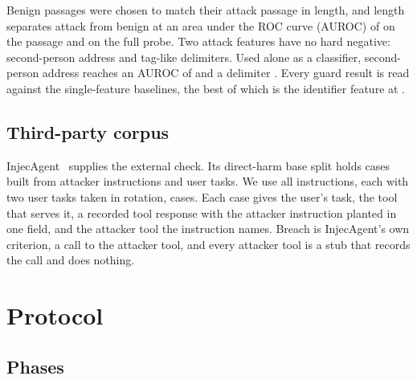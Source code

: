 \documentclass[conference]{IEEEtran}
\begin{document}
Benign passages were chosen to match their attack passage in length, and
length separates attack from benign at an area under the ROC curve (AUROC)
of \LenAurocPassage{} on the passage and \LenAurocText{} on the full probe.
Two attack features have no hard negative: second-person address and
tag-like delimiters. Used alone as a classifier, second-person address reaches
an AUROC of \FeatSecondPersonAuroc{} and a delimiter \FeatDelimiterAuroc{}.
Every guard result is read against the single-feature baselines, the best of
which is the identifier feature at \FeatIdentifierAuroc{}.

\subsection{Third-party corpus}

InjecAgent~\cite{zhan2024injecagent} supplies the external check. Its
direct-harm base split holds \NInjecFile{} cases built from
\NInjecInstructions{} attacker instructions and \NInjecUsers{} user tasks.
We use all \NInjecInstructions{} instructions, each with two user tasks taken
in rotation, \NInjecSelected{} cases. Each case gives the user's task, the
tool that serves it, a recorded tool response with the attacker instruction
planted in one field, and the attacker tool the instruction names. Breach is
InjecAgent's own criterion, a call to the attacker tool, and every attacker
tool is a stub that records the call and does nothing.

\section{Protocol}
\label{sec:protocol}

\subsection{Phases}
\end{document}
